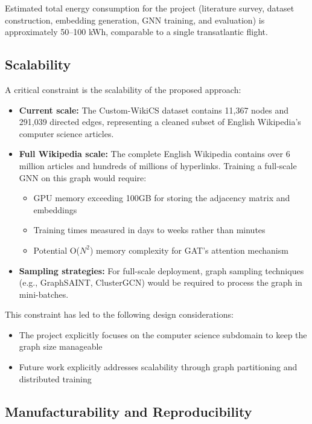 Estimated total energy consumption for the project (literature survey, dataset construction, embedding generation, GNN training, and evaluation) is approximately 50--100 kWh, comparable to a single transatlantic flight.

\subsection{Scalability}

A critical constraint is the scalability of the proposed approach:

\begin{itemize}
    \item \textbf{Current scale:} The Custom-WikiCS dataset contains 11,367 nodes and 291,039 directed edges, representing a cleaned subset of English Wikipedia's computer science articles.
    \item \textbf{Full Wikipedia scale:} The complete English Wikipedia contains over 6 million articles and hundreds of millions of hyperlinks. Training a full-scale GNN on this graph would require:
    \begin{itemize}
        \item GPU memory exceeding 100GB for storing the adjacency matrix and embeddings
        \item Training times measured in days to weeks rather than minutes
        \item Potential O($N^2$) memory complexity for GAT's attention mechanism
    \end{itemize}
    \item \textbf{Sampling strategies:} For full-scale deployment, graph sampling techniques (e.g., GraphSAINT, ClusterGCN) would be required to process the graph in mini-batches.
\end{itemize}

This constraint has led to the following design considerations:
\begin{itemize}
    \item The project explicitly focuses on the computer science subdomain to keep the graph size manageable
    \item Future work explicitly addresses scalability through graph partitioning and distributed training
\end{itemize}

\subsection{Manufacturability and Reproducibility}


